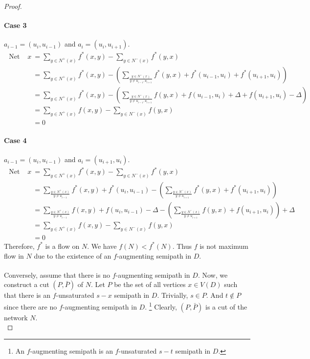 \begin{proof}
	\paragraph{Case 3} $a_{i-1} = (u_i, u_{i-1})$ and $a_i = (u_i,u_{i+1})$.
	\begin{align*}
		\text{ Net flow out of } x
		& = \sum_{y \in N^+(x)} f^*(x,y) - \sum_{y \in N^-(x)} f^*(y,x) \\
		& = \sum_{y \in N^+(x)} f^*(x,y) - \left( \sum_{\frac{y \in N^-(x)}{y \ne u_{i-1}, u_{i+1}}} f^*(y,x) + f^*(u_{i-1},u_i) + f^*(u_{i+1},u_i) \right)\\
		& = \sum_{y \in N^+(x)} f^*(x,y) - \left( \sum_{\frac{y \in N^-(x)}{y \ne u_{i-1}, u_{i+1}}} f(y,x) + f(u_{i-1},u_i) + \Delta + f(u_{i+1},u_i) - \Delta \right)\\
		& = \sum_{y \in N^+(x)} f(x,y) - \sum_{y \in N^-(x)} f(y,x) \\
		& = 0
	\end{align*}

	\paragraph{Case 4} $a_{i-1} = (u_i,u_{i-1})$ and $a_i = (u_{i+1},u_i)$.
	\begin{align*}
		\text{ Net flow out of } x
		& = \sum_{y \in N^+(x)} f^*(x,y) - \sum_{y \in N^-(x)} f^*(y,x) \\
		& = \sum_{\frac{y \in N^+(x)}{y \ne u_{i-1}}} f^*(x,y) + f^*(u_i,u_{i-1}) - \left( \sum_{\frac{y \in N^-(x)}{y \ne u_{i+1}}} f^*(y,x) + f^*(u_{i+1},u_i) \right)\\
		& = \sum_{\frac{y \in N^+(x)}{y \ne u_{i-1}}} f(x,y) + f(u_i,u_{i-1}) - \Delta - \left( \sum_{\frac{y \in N^-(x)}{y \ne u_{i+1}}} f(y,x) + f(u_{i+1},u_i) \right) + \Delta \\
		& = \sum_{y \in N^+(x)} f(x,y) - \sum_{y \in N^-(x)} f(y,x) \\
		& = 0
	\end{align*}
	Therefore, $f^*$ is a flow on $N$.
	We have $f(N) < f^*(N)$.
	Thus $f$ is not maximum flow in $N$ due to the existence of an $f$-augmenting semipath in $D$.

	\paragraph{}Conversely, assume that there is no $f$-augmenting semipath in $D$.
	Now, we construct a cut $(P,\bar{P})$ of $N$.
	Let $P$ be the set of all vertices $x \in V(D)$ such that there is an $f$-unsaturated $s-x$ semipath in $D$.
	Trivially, $s \in P$.
	And $t \not\in P$ since there are no $f$-augmenting semipath in $D$.
	\footnote{An $f$-augmenting semipath is an $f$-unsaturated $s-t$ semipath in $D$.}
	Clearly, $(P,\bar{P})$ is a cut of the network $N$.\\



\end{proof}
